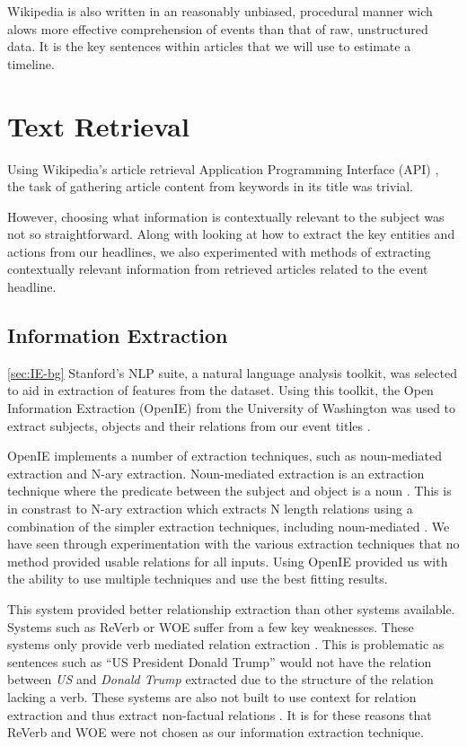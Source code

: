 \documentclass[bsc,frontabs,twoside,singlespacing,parskip,deptreport]{infthesis}     %
\begin{document}
Wikipedia is also written in an reasonably unbiased, procedural manner wich alows more effective comprehension of events
than that of raw, unstructured data.
It is the key sentences within articles that we will use to estimate a timeline.

\section{Text Retrieval}
Using Wikipedia's article retrieval Application Programming Interface (API) \cite{wikipediaAPI}, the task of gathering article content
from keywords in its title was trivial.

However, choosing what information is contextually relevant to the subject was not so straightforward.
Along with looking at how to extract the key entities and actions from our 
headlines, we also experimented with methods of extracting contextually relevant information from
retrieved articles related to the event headline.

\subsection{Information Extraction}\ref{sec:IE-bg}
Stanford's NLP suite,
a natural language analysis toolkit,
was selected to aid in extraction of features from the dataset.
Using this toolkit, the Open Information Extraction (OpenIE) from
the University of Washington was used to extract subjects, objects
and their relations from our event titles \cite{schmitz2012open}.


OpenIE implements a number of extraction techniques, such as noun-mediated extraction and N-ary extraction.
Noun-mediated extraction is an extraction technique where the predicate between the subject and object is a noun \cite{mirrezaei2015triplex}.
This is in constrast to N-ary extraction which extracts N length relations using a combination of the simpler extraction techniques, including noun-mediated \cite{akbik2012kraken}. 
We have seen through experimentation with the various extraction techniques that no method provided
usable relations for all inputs. Using OpenIE provided us with the ability to use multiple techniques and
use the best fitting results.

This system provided better relationship extraction than other systems available. Systems such as
ReVerb\cite{fader2011identifying} or WOE\cite{wu2010open} suffer from a few key weaknesses. These systems only provide verb mediated relation extraction \cite{schmitz2012open}.
This is problematic as sentences such as ``US President Donald Trump'' would not have the relation between \textit{US} and \textit{Donald Trump} extracted due to the structure of the relation lacking a verb.
These systems are also not built to use context for relation extraction and thus extract non-factual relations \cite{schmitz2012open}.
It is for these reasons that ReVerb and WOE were not chosen as our information extraction technique.
\end{document}
